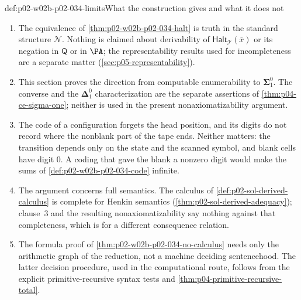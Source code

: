 \begin{hbwarning}{def:p02-w02b-p02-034-limits}{What the construction gives and what it does not}
\begin{enumerate}
 \item The equivalence of \cref{thm:p02-w02b-p02-034-halt} is truth in the
   standard structure \(\mathcal N\).  Nothing is claimed about derivability of
   \(\mathsf{Halt}_{\mathcal T}(\bar x)\) or its negation in \(\mathsf Q\) or in
   \(\PA\); the representability results used for incompleteness are a
   separate matter (\cref{sec:p05-representability}).
 \item This section proves the direction from computable enumerability
   to \(\boldsymbol\Sigma^0_1\). The converse and the
   \(\boldsymbol\Delta^0_1\) characterization are the separate
   assertions of \cref{thm:p04-ce-sigma-one}; neither is used in
   the present nonaxiomatizability argument.
 \item The code of a configuration forgets the head position, and its digits
   do not record where the nonblank part of the tape ends.  Neither matters:
   the transition depends only on the state and the scanned symbol, and
   blank cells have digit \(0\).  A coding that gave the blank a nonzero digit
   would make the sums of \cref{def:p02-w02b-p02-034-code} infinite.
 \item The argument concerns full semantics.  The calculus of
   \cref{def:p02-sol-derived-calculus} is complete for Henkin semantics
   (\cref{thm:p02-sol-derived-adequacy}); clause~3 and the resulting
   nonaxiomatizability say nothing against that completeness, which is for a
   different consequence relation.
 \item The formula proof of
   \cref{thm:p02-w02b-p02-034-no-calculus} needs only the arithmetic
   graph of the reduction, not a machine deciding sentencehood.
   The latter decision procedure, used in the computational route,
   follows from the explicit primitive-recursive syntax tests and
   \cref{thm:p04-primitive-recursive-total}.
\end{enumerate}
\end{hbwarning}

